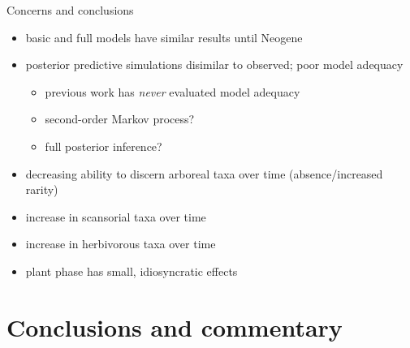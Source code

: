 \documentclass{beamer}
\begin{document}
\begin{frame}
  \begin{block}{Concerns and conclusions}
    \begin{itemize}
      \item basic and full models have similar results until Neogene
      \item posterior predictive simulations disimilar to observed; poor model adequacy
        \begin{itemize}
          \item previous work has \emph{never} evaluated model adequacy
          \item second-order Markov process?
          \item full posterior inference?
        \end{itemize}
      \item decreasing ability to discern arboreal taxa over time (absence/increased rarity)
      \item increase in scansorial taxa over time
      \item increase in herbivorous taxa over time
      \item plant phase has small, idiosyncratic effects
    \end{itemize}
  \end{block}
\end{frame}




\section{Conclusions and commentary}

\end{document}
